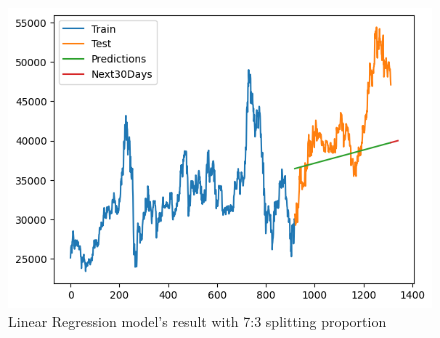 \documentclass{ieeeojies}
\begin{document}
\begin{figure}[H]
  \centering
  \begin{minipage}{0.6\linewidth}
    \centering
    \includegraphics[width=\linewidth]{bibliography/diagram/LR-BID.png}
    \caption{Linear Regression model’s result with 7:3 splitting proportion}
    \label{fig8}
  \end{minipage}
\end{figure}
\end{document}
